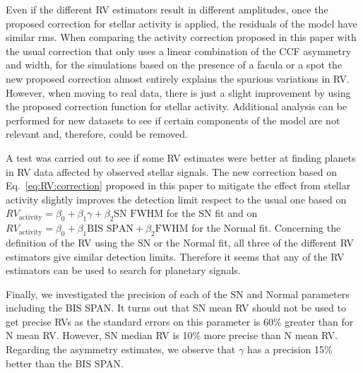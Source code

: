 \documentclass{aa}
\begin{document}
Even if the different RV estimators result in different amplitudes, once the proposed correction for stellar activity is applied, the residuals of the model have similar rms.
When comparing the activity correction proposed in this paper with the usual correction that only uses a linear combination of the CCF asymmetry and width, for the simulations based on the presence of a facula or a spot the new proposed correction almost entirely explains the spurious variations in RV. However, when moving to real data, there is just a slight improvement by using the proposed correction function for stellar activity. 
Additional analysis can be performed for new datasets to see if certain components of the model are not relevant and, therefore, could be removed.

A test was carried out to see if some RV estimates were better at finding planets in RV data affected by observed stellar signals. The new correction based on Eq.~\eqref{eq:RV:correction} proposed in this paper to mitigate the effect from stellar activity slightly improves the detection limit respect to the usual one based on $RV_{\text{activity}}=\beta_0+\beta_1 \gamma + \beta_2 \text{SN FWHM}$ for the SN fit and on $RV_{\text{activity}}=\beta_0+\beta_1 \text{BIS SPAN} + \beta_2 \text{FWHM}$ for the Normal fit.
Concerning the definition of the RV using the SN or the Normal fit, all three of the different RV estimators give similar detection limits. Therefore it seems that any of the RV estimators can be used to search for planetary signals.

Finally, we investigated the precision of each of the SN and Normal parameters including the BIS SPAN. It turns out that SN mean RV should not be used to get precise RVs as the standard errors on this parameter is 60\% greater than for N mean RV. 
However, SN median RV is 10\% more precise than N mean RV. 
Regarding the asymmetry estimates, we observe that $\gamma$ has a precision 15\% better than the BIS SPAN.








\end{document}

